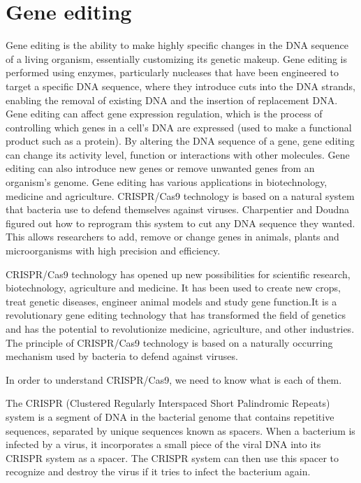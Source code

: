 \documentclass[sn-standardnature]{sn-jnl}%
\theoremstyle{thmstyleone}%
\theoremstyle{thmstyletwo}%
\theoremstyle{thmstylethree}%
\begin{document}
\section*{Gene editing}\label{sec5}


Gene editing is the ability to make highly specific changes in the DNA sequence of a living organism, essentially customizing its genetic makeup. Gene editing is performed using enzymes, particularly nucleases that have been engineered to target a specific DNA sequence, where they introduce cuts into the DNA strands, enabling the removal of existing DNA and the insertion of replacement DNA. Gene editing can affect gene expression regulation, which is the process of controlling which genes in a cell’s DNA are expressed (used to make a functional product such as a protein). By altering the DNA sequence of a gene, gene editing can change its activity level, function or interactions with other molecules. Gene editing can also introduce new genes or remove unwanted genes from an organism’s genome. Gene editing has various applications in biotechnology, medicine and agriculture.
CRISPR/Cas9 technology is based on a natural system that bacteria use to defend themselves against viruses. Charpentier and Doudna figured out how to reprogram this system to cut any DNA sequence they wanted. This allows researchers to add, remove or change genes in animals, plants and microorganisms with high precision and efficiency.

CRISPR/Cas9 technology has opened up new possibilities for scientific research, biotechnology, agriculture and medicine. It has been used to create new crops, treat genetic diseases, engineer animal models and study gene function.It is a revolutionary gene editing technology that has transformed the field of genetics and has the potential to revolutionize medicine, agriculture, and other industries. The principle of CRISPR/Cas9 technology is based on a naturally occurring mechanism used by bacteria to defend against viruses.

In order to understand CRISPR/Cas9, we need to know what is each of them.

The CRISPR (Clustered Regularly Interspaced Short Palindromic Repeats) system is a segment of DNA in the bacterial genome that contains repetitive sequences, separated by unique sequences known as spacers. When a bacterium is infected by a virus, it incorporates a small piece of the viral DNA into its CRISPR system as a spacer. The CRISPR system can then use this spacer to recognize and destroy the virus if it tries to infect the bacterium again.
\end{document}
